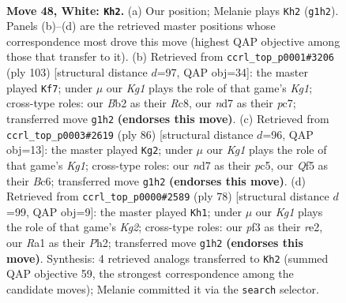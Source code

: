 \documentclass[11pt]{article}
\begin{document}
\clearpage

\begin{figure}[p]\centering
\begin{subfigure}{0.46\textwidth}\centering
\resizebox{\linewidth}{!}{%
\newchessgame
\chessboard[
  setfen={3q3k/1b1n1p2/3P1n2/2p2Q2/p6P/5pP1/PB6/R5K1 w - - 9 48},
  showmover=false,
  pgfstyle=straightmove, color=movearrow, markmove={g1-h2}
]}
\caption{}
\end{subfigure}\hfill
\begin{subfigure}{0.46\textwidth}\centering
\resizebox{\linewidth}{!}{%
\newchessgame
\chessboard[
  setfen={2r3k1/2P3p1/8/p2Nqp2/P7/1p5P/1P4P1/3Q3K b - - 0 52},
  showmover=false,
  pgfstyle=straightmove, color=movearrow, markmove={g8-f7}
]}
\caption{}
\end{subfigure}
\\[4pt]
\begin{subfigure}{0.46\textwidth}\centering
\resizebox{\linewidth}{!}{%
\newchessgame
\chessboard[
  setfen={8/2Qnk1p1/1pB3p1/2p5/6Pp/7P/PP3P2/3q2K1 w - - 1 44},
  showmover=false,
  pgfstyle=straightmove, color=movearrow, markmove={g1-g2}
]}
\caption{}
\end{subfigure}\hfill
\begin{subfigure}{0.46\textwidth}\centering
\resizebox{\linewidth}{!}{%
\newchessgame
\chessboard[
  setfen={2R2q1k/7p/1Q1pB1p1/3P1n2/p4P1b/8/4r1KP/8 w - - 8 40},
  showmover=false,
  pgfstyle=straightmove, color=movearrow, markmove={g2-h1}
]}
\caption{}
\end{subfigure}
\caption{\textbf{Move 48, White: \texttt{Kh2}.} (a) Our position; Melanie plays \texttt{Kh2} (\texttt{g1h2}). Panels (b)--(d) are the retrieved master positions whose correspondence most drove this move (highest QAP objective among those that transfer to it). (b) Retrieved from \texttt{ccrl\_top\_p0001\#3206} (ply 103) [structural distance $d$=97, QAP obj=34]: the master played \texttt{Kf7}; under $\mu$ our \emph{Kg1} plays the role of that game's \emph{Kg1}; cross-type roles: our \emph{B}b2 as their \emph{R}c8, our \emph{n}d7 as their \emph{p}c7; transferred move \texttt{g1h2} \textbf{(endorses this move)}. (c) Retrieved from \texttt{ccrl\_top\_p0003\#2619} (ply 86) [structural distance $d$=96, QAP obj=13]: the master played \texttt{Kg2}; under $\mu$ our \emph{Kg1} plays the role of that game's \emph{Kg1}; cross-type roles: our \emph{n}d7 as their \emph{p}c5, our \emph{Q}f5 as their \emph{B}c6; transferred move \texttt{g1h2} \textbf{(endorses this move)}. (d) Retrieved from \texttt{ccrl\_top\_p0000\#2589} (ply 78) [structural distance $d$=99, QAP obj=9]: the master played \texttt{Kh1}; under $\mu$ our \emph{Kg1} plays the role of that game's \emph{Kg2}; cross-type roles: our \emph{p}f3 as their \emph{r}e2, our \emph{R}a1 as their \emph{P}h2; transferred move \texttt{g1h2} \textbf{(endorses this move)}. Synthesis: 4 retrieved analogs transferred to \texttt{Kh2} (summed QAP objective 59, the strongest correspondence among the candidate moves); Melanie committed it via the \texttt{search} selector.}
\label{fig:thought-m94}
\end{figure}
\end{document}
